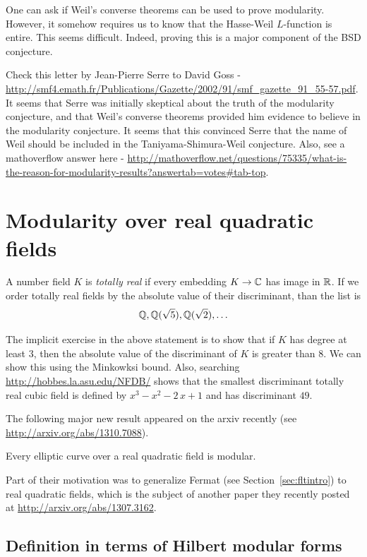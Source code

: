 \documentclass{book}
\begin{document}
One can ask if Weil's converse theorems can be used to prove modularity. However, it somehow requires us to know that the Hasse-Weil $L$-function is entire. This seems difficult. Indeed, proving this is a major component of the BSD conjecture.

Check this letter by Jean-Pierre Serre to David Goss - \url{http://smf4.emath.fr/Publications/Gazette/2002/91/smf_gazette_91_55-57.pdf}. It seems that Serre was initially skeptical about the truth of the modularity conjecture, and that Weil's converse theorems provided him evidence to believe in the modularity conjecture. It seems that this convinced Serre that the name of Weil should be included in the Taniyama-Shimura-Weil conjecture. Also, see a mathoverflow answer here - \url{http://mathoverflow.net/questions/75335/what-is-the-reason-for-modularity-results?answertab=votes#tab-top}.

\section{Modularity over real quadratic fields}

A number field $K$ is {\em totally real} if
every embedding $K\to \mathbb{C}$ has image in $\mathbb{R}$.
If we order totally real fields by the absolute
value of their discriminant, than the list is
$$
  \mathbb{Q}, \mathbb{Q}(\sqrt{5}), \mathbb{Q}(\sqrt{2}), \ldots
$$
\begin{exercise}
The implicit exercise in the above statement is to show
that if $K$ has degree at least $3$, then the
absolute value of the discriminant of $K$
is greater than $8$.  We can show this using the
Minkowksi bound. Also, searching  \url{http://hobbes.la.asu.edu/NFDB/}
shows that the smallest discriminant
totally real cubic field is defined by
$x^{3} - x^{2} - 2 \, x + 1$ and has discriminant $49$.
\end{exercise}

The following major new result appeared on the arxiv recently (see
\url{http://arxiv.org/abs/1310.7088}).
\begin{theorem}
Every elliptic curve over a real quadratic field is modular.
\end{theorem}
Part of their motivation was to generalize
Fermat (see Section~\ref{sec:fltintro}) to real quadratic fields, which
is the subject of another paper they recently posted at \url{http://arxiv.org/abs/1307.3162}.


\subsection{Definition in terms of Hilbert modular forms}
\end{document}
